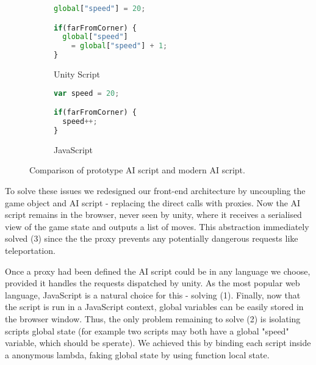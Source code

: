 \begin{figure}[H]
\centering
\begin{subfigure}{.5\textwidth}
  \centering
\begin{lstlisting}[language=JavaScript]  
global["speed"] = 20;

if(farFromCorner) {
  global["speed"] 
    = global["speed"] + 1;
}

\end{lstlisting}
  \caption{Unity Script}
  \label{fig:sub1}
\end{subfigure}%
\begin{subfigure}{.5\textwidth}
  \centering
\begin{lstlisting}[language=JavaScript]  
var speed = 20;

if(farFromCorner) {
  speed++;
}
\end{lstlisting}
  \caption{JavaScript}
  \label{fig:sub2}
\end{subfigure}
\caption{Comparison of prototype AI script and modern AI script.}
\label{fig:unityvsjava}
\end{figure}

To solve these issues we redesigned our front-end architecture by uncoupling the game object and AI script - replacing the direct calls with proxies. Now the AI script remains in the browser, never seen by unity, where it receives a serialised view of the game state and outputs a list of moves. This abstraction immediately solved (3) since the the proxy prevents any potentially dangerous requests like teleportation. 

Once a proxy had been defined the AI script could be in any language we choose, provided it handles the requests dispatched by unity. As the most popular web language, JavaScript is a natural choice for this - solving (1). Finally, now that the script is run in a JavaScript context, global variables can be easily stored in the browser window. Thus, the only problem remaining to solve (2) is isolating scripts global state (for example two scripts may both have a global "speed" variable, which should be sperate). We achieved this by binding each script inside a anonymous lambda, faking global state by using function local state.
